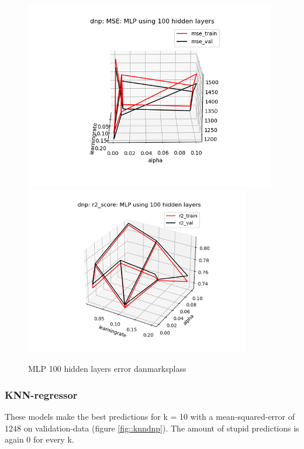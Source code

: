 \documentclass[12pt,a4paper]{scrartcl}		%
\begin{document}
\begin{figure}[h]
    \centering
    \includegraphics[scale = 1.1]{dnp_mlp_mse_100.png}
    \includegraphics[scale = 1.1]{dnp_mlp_r2_100.png}
    \caption{MLP 100 hidden layers error danmarksplass}
    \label{fig::mlpdnp100}
\end{figure}

\subsubsection{KNN-regressor}
These models make the best predictions for k = 10 with a mean-squared-error of 1248 on validation-data (figure \ref{fig::knndnp}). 
The amount of stupid predictions is again 0 for every k. 
\end{document}
